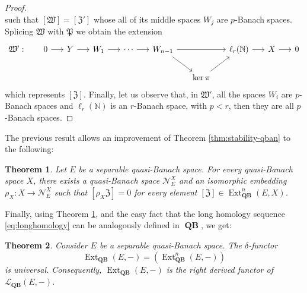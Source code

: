 \documentclass[12pt,a4paper]{amsproc}
\newtheorem{thm}{Theorem}[section]
\theoremstyle{remark}
\theoremstyle{definition}
\newcommand{\Ext}{\operatorname{Ext}}
\newcommand{\QBan}{\operatorname{\textbf{QB}}}
\numberwithin{equation}{section}
\begin{document}
\begin{proof}
\begin{equation}
\end{equation}
such that $[\mathfrak{W}]=[\mathfrak{Z'}]$ whose all of its middle spaces $W_j$ are $p$-Banach spaces. Splicing $\mathfrak{W}$ with $\mathfrak{P}$ we obtain the extension
\begin{equation}
    \notag 
\begin{tikzcd}[column sep=1.5em]
{\mathfrak{W'}:} & 0 \arrow[r] & Y \arrow[r] & W_1 \arrow[r] & \cdots \arrow[r] & W_{n-1} \arrow[rd] \arrow[rr] &                     & \ell_r(\mathbb N) \arrow[r] & X \arrow[r] & 0 \\
                   &             &             &               &                  &                           & \ker \pi \arrow[ru] &                             &             &  
\end{tikzcd} 
\end{equation}
which represents $[\mathfrak{Z}]$. Finally, let us observe that, in $\mathfrak{W'}$, all the spaces $W_i$ are $p$-Banach spaces and $\ell_r(\mathbb{N})$ is an $r$-Banach space, with $p <r$, then they are all $p$-Banach spaces.
\end{proof}
The previous result allows an improvement of Theorem \ref{thm:stability-qban} to the following:
\begin{thm}\label{thm:eff_qban}
Let $E$ be a separable quasi-Banach space. For every quasi-Banach space $X$, there exists a quasi-Banach space $\mathcal{N}_E^X$ and an isomorphic embedding $\rho_X: X \to \mathcal{N}_E^X$ such that $[\rho_X \mathfrak{Z}] = 0$ for every element $[\mathfrak{Z}] \in \Ext_{\QBan}^n(E,X)$.
\end{thm}
Finally, using Theorem \ref{thm:eff_qban}, and the easy fact that the long homology sequence \eqref{eq:longhomology} can be analogously defined in $\QBan$, we get:
\begin{thm}
    Consider $E$ be a separable quasi-Banach space. The $\delta$-functor 
    $$\Ext_{\QBan}(E,-)=(\Ext_{\QBan}^n(E,-))$$ 
    is universal. Consequently, $\Ext_{\QBan}(E,-)$ is the right derived functor of $\mathcal{L}_{\QBan}(E,-)$.
\end{thm}
\end{document}
